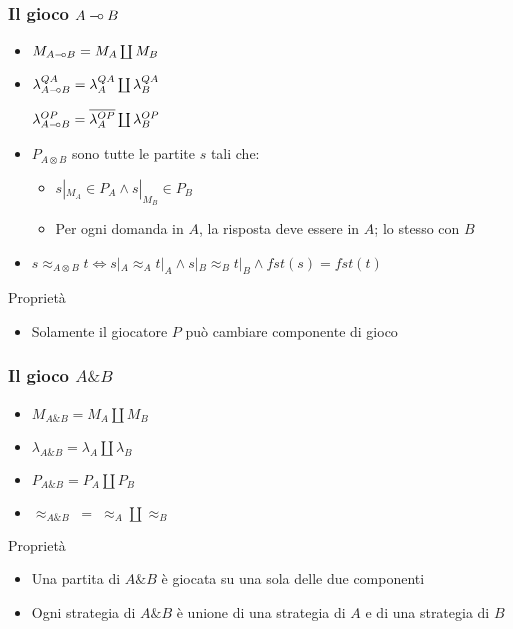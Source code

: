 \documentclass{beamer}
\newcommand{\limp}{\mathbin{{-}\mkern-3.5mu{\circ}}}
\begin{document}
\begin{frame}
	
	\frametitle{Il gioco $A \limp B$}
	
	\begin{itemize}
		\item $M_{A\limp B}=M_A \coprod M_B$
		\item $\lambda^{QA}_{A\limp B}=\lambda^{QA}_A \coprod \lambda^{QA}_B$
		
		$\lambda^{OP}_{A\limp B}=\overline{\lambda^{OP}_A} \coprod \lambda^{OP}_B$
		\item $P_{A\otimes B}$ sono tutte le partite $s$ tali che:
		\begin{itemize}
			\item $s|_{M_A} \in P_A \wedge s|_{M_B} \in P_B$
			\item Per ogni domanda in $A$, la risposta deve essere in $A$; lo stesso con $B$
		\end{itemize}
		\item $s\approx_{A\otimes B} t \Leftrightarrow s|_A \approx_A t|_A \wedge s|_B \approx_B t|_B \wedge fst(s)=fst(t)$ 
	\end{itemize}
	
	\begin{block}{Proprietà}
		
		\begin{itemize}
			\item Solamente il giocatore $P$ può cambiare componente di gioco
		\end{itemize}
	
	\end{block}
	
\end{frame}



\begin{frame}
	
	\frametitle{Il gioco $A \& B$}
	
	\begin{itemize}
		\item $M_{A\& B}=M_A \coprod M_B$
		\item $\lambda_{A\& B}=\lambda_A \coprod \lambda_B$
		\item $P_{A\& B}=P_A \coprod P_B$
		\item $\approx_{A\& B} \; = \; \approx_A \coprod \approx_B$ 
	\end{itemize}
	
	\begin{block}{Proprietà}
		\begin{itemize}
			\item Una partita di $A\& B$ è giocata su una sola delle due componenti
			\item Ogni strategia di $A\& B$ è unione di una strategia di $A$ e di una strategia di $B$
		\end{itemize}
		
	\end{block}
	
\end{frame}
\end{document}
